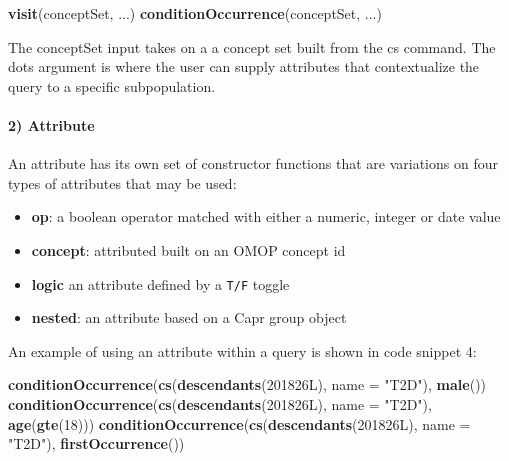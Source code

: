 \documentclass[
]{article}
\newenvironment{Shaded}{\begin{snugshade}}{\end{snugshade}}
\newcommand{\AttributeTok}[1]{\textcolor[rgb]{0.13,0.29,0.53}{#1}}
\newcommand{\DataTypeTok}[1]{\textcolor[rgb]{0.13,0.29,0.53}{#1}}
\newcommand{\DecValTok}[1]{\textcolor[rgb]{0.00,0.00,0.81}{#1}}
\newcommand{\FunctionTok}[1]{\textcolor[rgb]{0.13,0.29,0.53}{\textbf{#1}}}
\newcommand{\NormalTok}[1]{#1}
\newcommand{\StringTok}[1]{\textcolor[rgb]{0.31,0.60,0.02}{#1}}
\providecommand{\tightlist}{%
  \setlength{\itemsep}{0pt}\setlength{\parskip}{0pt}}
\begin{document}
\begin{Shaded}
\begin{Highlighting}[]
\FunctionTok{visit}\NormalTok{(conceptSet, ...)}
\FunctionTok{conditionOccurrence}\NormalTok{(conceptSet, ...)}
\end{Highlighting}
\end{Shaded}

The conceptSet input takes on a a concept set built from the cs command.
The dots argument is where the user can supply attributes that
contextualize the query to a specific subpopulation.

\paragraph{2) Attribute}\label{attribute}

An attribute has its own set of constructor functions that are
variations on four types of attributes that may be used:

\begin{itemize}
\tightlist
\item
  \textbf{op}: a boolean operator matched with either a numeric, integer
  or date value
\item
  \textbf{concept}: attributed built on an OMOP concept id
\item
  \textbf{logic} an attribute defined by a \texttt{T/F} toggle
\item
  \textbf{nested}: an attribute based on a Capr group object
\end{itemize}

An example of using an attribute within a query is shown in code snippet
4:

\begin{Shaded}
\begin{Highlighting}[]
\FunctionTok{conditionOccurrence}\NormalTok{(}\FunctionTok{cs}\NormalTok{(}\FunctionTok{descendants}\NormalTok{(}\DecValTok{201826}\DataTypeTok{L}\NormalTok{), }\AttributeTok{name =} \StringTok{"T2D"}\NormalTok{), }\FunctionTok{male}\NormalTok{())}
\FunctionTok{conditionOccurrence}\NormalTok{(}\FunctionTok{cs}\NormalTok{(}\FunctionTok{descendants}\NormalTok{(}\DecValTok{201826}\DataTypeTok{L}\NormalTok{), }\AttributeTok{name =} \StringTok{"T2D"}\NormalTok{), }\FunctionTok{age}\NormalTok{(}\FunctionTok{gte}\NormalTok{(}\DecValTok{18}\NormalTok{)))}
\FunctionTok{conditionOccurrence}\NormalTok{(}\FunctionTok{cs}\NormalTok{(}\FunctionTok{descendants}\NormalTok{(}\DecValTok{201826}\DataTypeTok{L}\NormalTok{), }\AttributeTok{name =} \StringTok{"T2D"}\NormalTok{), }\FunctionTok{firstOccurrence}\NormalTok{())}
\end{Highlighting}
\end{Shaded}
\end{document}
